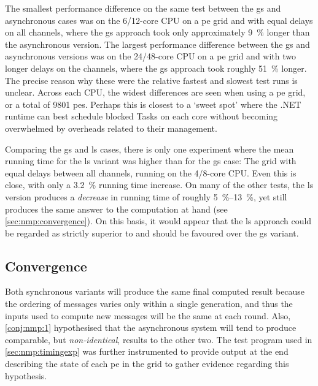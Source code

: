 The smallest performance difference on the same test between the \gls{gs} and asynchronous cases was on the 6/12-core CPU on a  \gls{pe} grid and with equal delays on all channels, where the \gls{gs} approach took only approximately \qty{9}{\percent} longer than the asynchronous version.  The largest performance difference between the \gls{gs} and asynchronous versions was on the 24/48-core CPU on a  \gls{pe} grid and with two longer delays on the channels, where the \gls{gs} approach took roughly \qty{51}{\percent} longer.  The precise reason why these were the relative fastest and slowest test runs is unclear.  Across each CPU, the widest differences are seen when using a  \gls{pe} grid, or a total of \num{9 801} \glspl{pe}.  Perhaps this is closest to a `sweet spot' where the .NET runtime can best schedule blocked Tasks on each core without becoming overwhelmed by overheads related to their management.

Comparing the \gls{gs} and \gls{ls} cases, there is only one experiment where the mean running time for the \gls{ls} variant was higher than for the \gls{gs} case:  The  grid with equal delays between all channels, running on the 4/8-core CPU.  Even this is close, with only a \qty{3.2}{\percent} running time increase.   On many of the other tests, the \gls{ls} version produces a \emph{decrease} in running time of roughly \qtyrange{5}{13}{\percent}, yet still produces the same answer to the computation at hand (see \cref{sec:nmp:convergence}).  On this basis, it would appear that the \gls{ls} approach could be regarded as strictly superior to and should be favoured over the \gls{gs} variant.

\subsection{\label{sec:nmp:convergence}Convergence}
Both synchronous variants will produce the same final computed result because the ordering of messages varies only within a single generation, and thus the inputs used to compute new messages will be the same at each round.  Also, \cref{conj:nmp:1} hypothesised that the asynchronous system will tend to produce comparable, but \emph{non-identical}, results to the other two.  The test program used in \cref{sec:nmp:timingexp} was further instrumented to provide output at the end describing the state of each \gls{pe} in the grid to gather evidence regarding this hypothesis.

